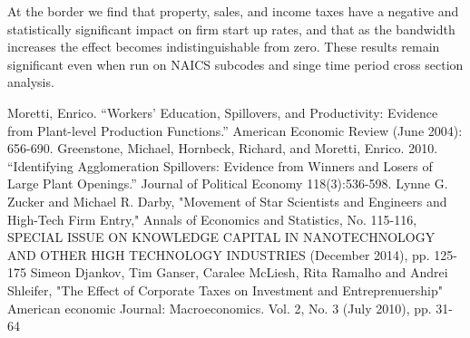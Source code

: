 \documentclass[12 pt, a4paper]{article}
\begin{document}
At the border we find that property, sales, and income taxes have a negative and statistically significant impact on firm start up rates, and that as the bandwidth increases the effect becomes indistinguishable from zero. These results remain significant even when run on NAICS subcodes and singe time period cross section analysis. 




\begin{thebibliography}{9}
Moretti, Enrico. “Workers’ Education, Spillovers, and Productivity: Evidence from Plant-level Production Functions.” American Economic Review (June 2004): 656-690.
Greenstone, Michael, Hornbeck, Richard, and Moretti, Enrico. 2010. “Identifying Agglomeration Spillovers: Evidence from Winners and Losers of Large Plant Openings.” Journal of Political Economy 118(3):536-598.
Lynne G. Zucker and Michael R. Darby, "Movement of Star Scientists and Engineers and High-Tech Firm Entry," Annals of Economics and Statistics, No. 115-116, SPECIAL ISSUE ON KNOWLEDGE CAPITAL IN NANOTECHNOLOGY AND OTHER HIGH TECHNOLOGY INDUSTRIES (December 2014), pp. 125-175
Simeon Djankov, Tim Ganser, Caralee McLiesh, Rita Ramalho and Andrei Shleifer, "The Effect of Corporate Taxes on Investment and Entreprenuership" American economic Journal: Macroeconomics. Vol. 2, No. 3 (July 2010), pp. 31-64
\end{thebibliography}
\end{document}
